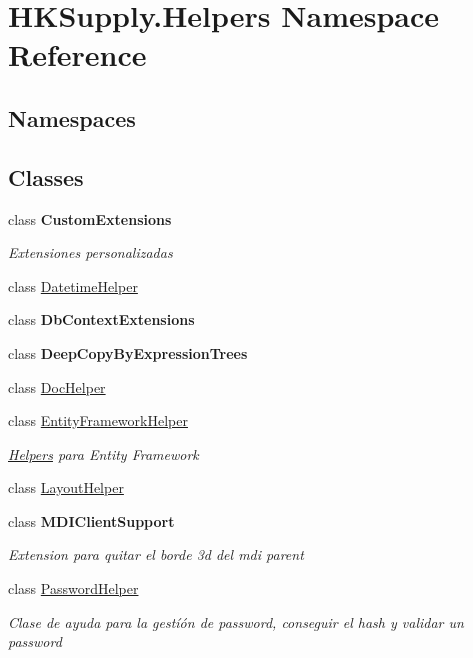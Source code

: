 \hypertarget{namespace_h_k_supply_1_1_helpers}{}\section{H\+K\+Supply.\+Helpers Namespace Reference}
\label{namespace_h_k_supply_1_1_helpers}
\subsection*{Namespaces}
\begin{DoxyCompactItemize}
\end{DoxyCompactItemize}
\subsection*{Classes}
\begin{DoxyCompactItemize}
\item 
class {\bfseries Custom\+Extensions}
\begin{DoxyCompactList}\small\item\em Extensiones personalizadas \end{DoxyCompactList}\item 
class \mbox{\hyperlink{class_h_k_supply_1_1_helpers_1_1_datetime_helper}{Datetime\+Helper}}
\item 
class {\bfseries Db\+Context\+Extensions}
\item 
class {\bfseries Deep\+Copy\+By\+Expression\+Trees}
\item 
class \mbox{\hyperlink{class_h_k_supply_1_1_helpers_1_1_doc_helper}{Doc\+Helper}}
\item 
class \mbox{\hyperlink{class_h_k_supply_1_1_helpers_1_1_entity_framework_helper}{Entity\+Framework\+Helper}}
\begin{DoxyCompactList}\small\item\em \mbox{\hyperlink{namespace_h_k_supply_1_1_helpers}{Helpers}} para Entity Framework \end{DoxyCompactList}\item 
class \mbox{\hyperlink{class_h_k_supply_1_1_helpers_1_1_layout_helper}{Layout\+Helper}}
\item 
class {\bfseries M\+D\+I\+Client\+Support}
\begin{DoxyCompactList}\small\item\em Extension para quitar el borde 3d del mdi parent \end{DoxyCompactList}\item 
class \mbox{\hyperlink{class_h_k_supply_1_1_helpers_1_1_password_helper}{Password\+Helper}}
\begin{DoxyCompactList}\small\item\em Clase de ayuda para la gestíón de password, conseguir el hash y validar un password \end{DoxyCompactList}\end{DoxyCompactItemize}
